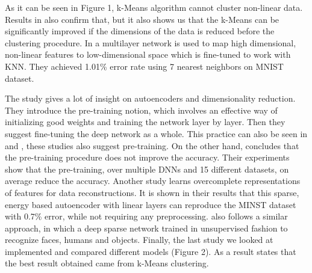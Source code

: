 \documentclass[journal]{IEEEtran}
\begin{document}
As it can be seen in Figure 1, k-Means algorithm cannot cluster non-linear data. Results in \cite{xie2016unsupervised} also confirm that, but it also shows us that the k-Means can be significantly improved if the dimensions of the data is reduced before the clustering procedure. In \cite{salakhutdinov2007learning} a multilayer network is used to map high dimensional, non-linear features to low-dimensional space which is fine-tuned to work with KNN. They achieved 1.01\% error rate using 7 nearest neighbors on MNIST dataset.\par

The study \cite{hinton2006reducing} gives a lot of insight on autoencoders and dimensionality reduction. They introduce the pre-training notion, which involves an effective way of initializing good weights and training the network layer by layer. Then they suggest fine-tuning the deep network as a whole. This practice can also be seen in \cite{vincent2010stacked} and \cite{xie2016unsupervised}, these studies also suggest pre-training. On the other hand, \cite{ma2015deep} concludes that the pre-training procedure does not improve the accuracy. Their experiments show that the pre-training, over multiple DNNs and 15 different datasets, on average reduce the accuracy. Another study\cite{poultney2007efficient} learns overcomplete representations of features for data reconstructions. It is shown in their results that this sparse, energy based autoencoder with linear layers can reproduce the MINST dataset with 0.7\% error, while not requiring any preprocessing.\cite{le2011building} also follows a similar approach, in which a deep sparse network trained in unsupervised fashion to recognize faces, humans and objects.
Finally, the last study we looked at implemented and compared different models (Figure 2). As a result \cite{coates2011analysis} states that the best result obtained came from k-Means clustering.
\end{document}
